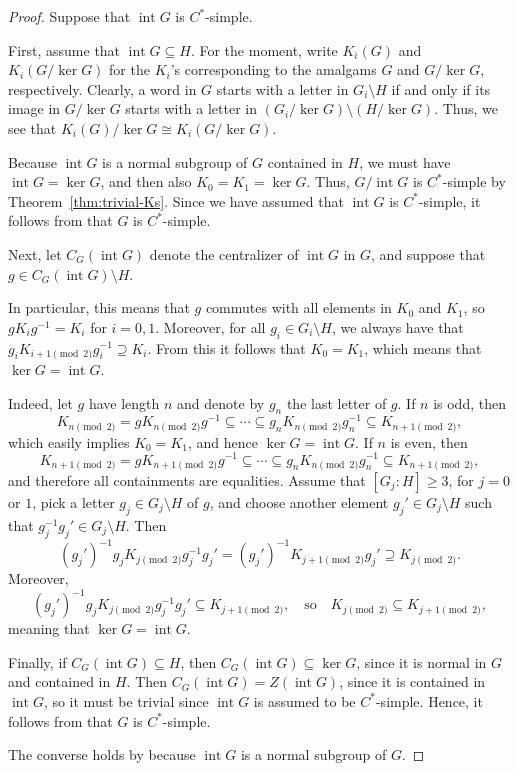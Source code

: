\documentclass[a4paper]{amsart}
\theoremstyle{plain}
\theoremstyle{definition}
\theoremstyle{remark}
\numberwithin{theorem}{section}
\begin{document}
\begin{proof}
Suppose that $\operatorname{int} G$ is $C^*$-simple.

First, assume that $\operatorname{int} G\subseteq H$.
For the moment, write $K_i(G)$ and $K_i(G/\ker G)$ for the $K_i$'s corresponding to the amalgams $G$ and $G/\ker G$, respectively.
Clearly, a word in $G$ starts with a letter in $G_i\setminus H$ if and only if its image in $G/\ker G$ starts with a letter in $(G_i/\ker G)\setminus (H/\ker G)$.
Thus, we see that $K_i(G)/\ker G\cong K_i(G/\ker G)$.

Because $\operatorname{int} G$ is a normal subgroup of $G$ contained in $H$, we must have $\operatorname{int} G=\ker G$, and then also $K_0=K_1=\ker G$.
Thus, $G/\operatorname{int} G$ is $C^*$-simple by Theorem~\ref{thm:trivial-Ks}.
Since we have assumed that $\operatorname{int} G$ is $C^*$-simple, it follows from \cite[Theorem~1.4]{BKKO} that $G$ is $C^*$-simple.

Next, let $C_G(\operatorname{int} G)$ denote the centralizer of $\operatorname{int} G$ in $G$, and suppose that $g\in C_G(\operatorname{int} G)\setminus H$.

In particular, this means that $g$ commutes with all elements in $K_0$ and $K_1$, so $gK_ig^{-1}=K_i$ for $i=0,1$. Moreover, for all $g_i\in G_i\setminus H$,
we always have that $g_iK_{i+1\pmod 2}g_i^{-1}\supseteq K_i$.
From this it follows that $K_0=K_1$, which means that $\ker G=\operatorname{int} G$.

Indeed, let $g$ have length $n$ and denote by $g_n$ the last letter of $g$.
If $n$ is odd, then
\[
K_{n \pmod 2}=gK_{n \pmod 2}g^{-1}\subseteq\dotsb\subseteq g_nK_{n \pmod 2}g_n^{-1}\subseteq K_{n+1 \pmod 2},
\]
which easily implies $K_0 = K_1$, and hence $\ker G=\operatorname{int} G$.
If $n$ is even, then
\[
K_{n+1 \pmod 2}=gK_{n+1 \pmod 2}g^{-1}\subseteq\dotsb\subseteq g_nK_{n \pmod 2}g_n^{-1}\subseteq K_{n+1 \pmod 2},
\]
and therefore all containments are equalities.
Assume that $[G_j:H]\geq 3$, for $j=0$ or $1$, pick a letter $g_j\in G_j\setminus H$ of $g$,
and choose another element $g_j'\in G_j\setminus H$ such that $g_j^{-1}g_j'\in G_j\setminus H$.
Then
\[
(g_j')^{-1}g_jK_{j\pmod 2}g_j^{-1}g_j' = (g_j')^{-1}K_{j+1\pmod 2}g_j' \supseteq K_{j\pmod 2}.
\]
Moreover,
\[
(g_j')^{-1}g_jK_{j\pmod 2}g_j^{-1}g_j' \subseteq K_{j+1\pmod 2},\quad\text{so}\quad K_{j\pmod 2} \subseteq K_{j+1\pmod 2},
\]
meaning that $\ker G=\operatorname{int} G$.

Finally, if $C_G(\operatorname{int} G)\subseteq H$, then $C_G(\operatorname{int} G)\subseteq\ker G$, since it is normal in $G$ and contained in $H$.
Then $C_G(\operatorname{int} G)=Z(\operatorname{int} G)$, since it is contained in $\operatorname{int} G$, so it must be trivial since $\operatorname{int} G$ is assumed to be $C^*$-simple.
Hence, it follows from \cite[Theorem~1.4]{BKKO} that $G$ is $C^*$-simple.

The converse holds by \cite[Theorem~1.4]{BKKO} because $\operatorname{int} G$ is a normal subgroup of $G$.
\end{proof}
\end{document}
